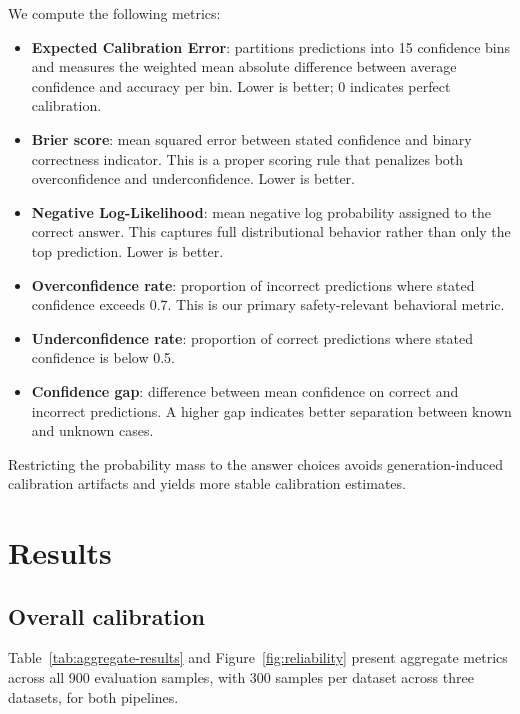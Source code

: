 \documentclass[10pt]{article}
\begin{document}
We compute the following metrics:
\begin{itemize}
    \item \textbf{Expected Calibration Error}: partitions predictions into 15 confidence bins and measures the weighted mean absolute difference between average confidence and accuracy per bin. Lower is better; 0 indicates perfect calibration.
    \item \textbf{Brier score}: mean squared error between stated confidence and binary correctness indicator. This is a proper scoring rule that penalizes both overconfidence and underconfidence. Lower is better.
    \item \textbf{Negative Log-Likelihood}: mean negative log probability assigned to the correct answer. This captures full distributional behavior rather than only the top prediction. Lower is better.
    \item \textbf{Overconfidence rate}: proportion of incorrect predictions where stated confidence exceeds 0.7. This is our primary safety-relevant behavioral metric.
    \item \textbf{Underconfidence rate}: proportion of correct predictions where stated confidence is below 0.5.
    \item \textbf{Confidence gap}: difference between mean confidence on correct and incorrect predictions. A higher gap indicates better separation between known and unknown cases.
\end{itemize}

Restricting the probability mass to the answer choices avoids generation-induced calibration artifacts and yields more stable calibration estimates.

\section{Results}

\subsection{Overall calibration}

Table~\ref{tab:aggregate-results} and Figure~\ref{fig:reliability} present aggregate metrics across all 900 evaluation samples, with 300 samples per dataset across three datasets, for both pipelines.
\end{document}
